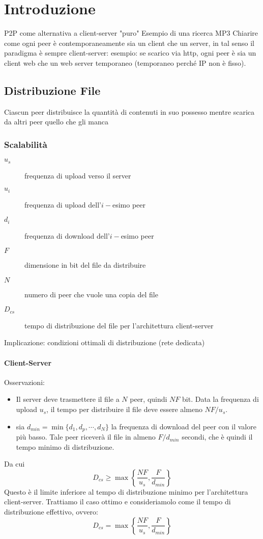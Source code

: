 \chapter{Introduzione}

P2P come alternativa a client-server "puro"
Esempio di una ricerca MP3 \cite{kurose_ross}
Chiarire come ogni peer è contemporaneamente sia un client che un server, in tal senso il paradigma è sempre client-server: esempio: se scarico via http, ogni peer è sia un client web che un web server temporaneo (temporaneo perché IP non è fisso).

\section{Distribuzione File}
Ciascun peer distribuisce la quantità di contenuti in suo possesso mentre scarica da altri peer quello che gli manca
\subsection{Scalabilità}
\begin{description}
\item[$u_s$]frequenza di upload verso il server
\item[$u_i$]frequenza di upload dell'$i-$esimo peer
\item[$d_i$]frequenza di download dell'$i-$esimo peer
\item[$F$]dimensione in bit del file da distribuire
\item[$N$]numero di peer che vuole una copia del file
\item[$D_{cs}$]tempo di distribuzione del file per l'architettura client-server
\end{description}
Implicazione: condizioni ottimali di distribuzione (rete dedicata)
\subsubsection{Client-Server}
Osservazioni:
\begin{itemize}
\item Il server deve trasmettere il file a $N$ peer, quindi $NF$ bit. Data la frequenza di upload $u_s$, il tempo per distribuire il file deve essere almeno $NF/u_s$.
\item sia $ d_{min} = \min\{d_1,d_p,\cdots,d_N \}$ la frequenza di download del peer con il valore più basso. Tale peer riceverà il file in almeno $F/d_{min}$ secondi, che è quindi il tempo minimo di distribuzione.
\end{itemize}
Da cui
\begin{displaymath}
D_{cs} \geq \max \left\lbrace \frac{NF}{u_s}, \frac{F}{d_{min}} \right\rbrace
\end{displaymath}
Questo è il limite inferiore al tempo di distribuzione minimo per l'architettura client-server. Trattiamo il caso ottimo e consideriamolo come il tempo di distribuzione effettivo, ovvero:
\begin{equation}
D_{cs} = \max \left\lbrace \frac{NF}{u_s}, \frac{F}{d_{min}} \right\rbrace
\end{equation}


